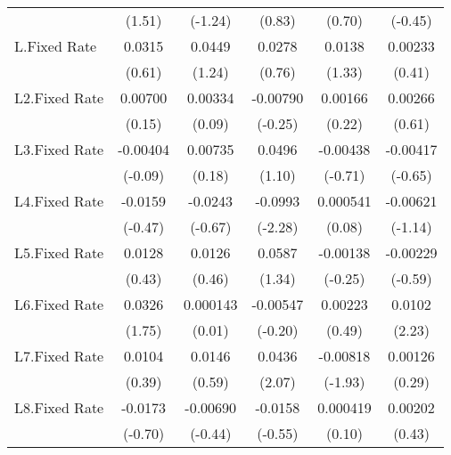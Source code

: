 {\begin{longtable}{l*{5}{c}}
                &   (1.51)         &  (-1.24)         &   (0.83)         &   (0.70)         &  (-0.45)         \\
[1em]
L.Fixed Rate    &   0.0315         &   0.0449         &   0.0278         &   0.0138         &  0.00233         \\
                &   (0.61)         &   (1.24)         &   (0.76)         &   (1.33)         &   (0.41)         \\
[1em]
L2.Fixed Rate   &  0.00700         &  0.00334         & -0.00790         &  0.00166         &  0.00266         \\
                &   (0.15)         &   (0.09)         &  (-0.25)         &   (0.22)         &   (0.61)         \\
[1em]
L3.Fixed Rate   & -0.00404         &  0.00735         &   0.0496         & -0.00438         & -0.00417         \\
                &  (-0.09)         &   (0.18)         &   (1.10)         &  (-0.71)         &  (-0.65)         \\
[1em]
L4.Fixed Rate   &  -0.0159         &  -0.0243         &  -0.0993\sym{*}  & 0.000541         & -0.00621         \\
                &  (-0.47)         &  (-0.67)         &  (-2.28)         &   (0.08)         &  (-1.14)         \\
[1em]
L5.Fixed Rate   &   0.0128         &   0.0126         &   0.0587         & -0.00138         & -0.00229         \\
                &   (0.43)         &   (0.46)         &   (1.34)         &  (-0.25)         &  (-0.59)         \\
[1em]
L6.Fixed Rate   &   0.0326         & 0.000143         & -0.00547         &  0.00223         &   0.0102\sym{*}  \\
                &   (1.75)         &   (0.01)         &  (-0.20)         &   (0.49)         &   (2.23)         \\
[1em]
L7.Fixed Rate   &   0.0104         &   0.0146         &   0.0436\sym{*}  & -0.00818         &  0.00126         \\
                &   (0.39)         &   (0.59)         &   (2.07)         &  (-1.93)         &   (0.29)         \\
[1em]
L8.Fixed Rate   &  -0.0173         & -0.00690         &  -0.0158         & 0.000419         &  0.00202         \\
                &  (-0.70)         &  (-0.44)         &  (-0.55)         &   (0.10)         &   (0.43)         \\

\end{longtable}}
